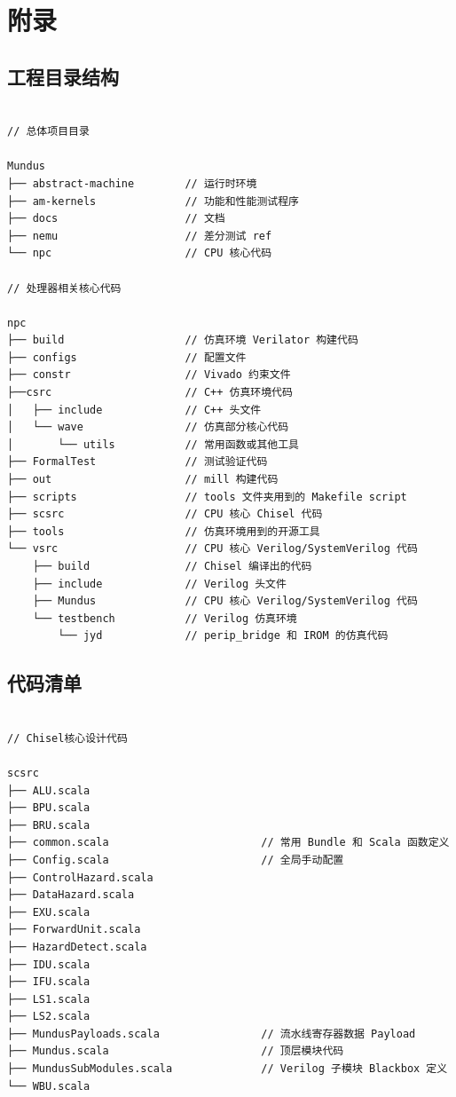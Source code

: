 \documentclass[UTF8,a4paper,zihao=-4]{ctexart}
\begin{document}
\section{附录}

\subsection{工程目录结构}

\begin{minipage}{\linewidth}
\begin{Verbatim}[fontsize=\small]

// 总体项目目录

Mundus
├── abstract-machine        // 运行时环境
├── am-kernels              // 功能和性能测试程序
├── docs                    // 文档
├── nemu                    // 差分测试 ref
└── npc                     // CPU 核心代码

// 处理器相关核心代码

npc
├── build                   // 仿真环境 Verilator 构建代码
├── configs                 // 配置文件
├── constr                  // Vivado 约束文件
├──csrc                     // C++ 仿真环境代码
│   ├── include             // C++ 头文件
│   └── wave                // 仿真部分核心代码
│       └── utils           // 常用函数或其他工具
├── FormalTest              // 测试验证代码
├── out                     // mill 构建代码
├── scripts                 // tools 文件夹用到的 Makefile script
├── scsrc                   // CPU 核心 Chisel 代码
├── tools                   // 仿真环境用到的开源工具
└── vsrc                    // CPU 核心 Verilog/SystemVerilog 代码
    ├── build               // Chisel 编译出的代码
    ├── include             // Verilog 头文件
    ├── Mundus              // CPU 核心 Verilog/SystemVerilog 代码
    └── testbench           // Verilog 仿真环境
        └── jyd             // perip_bridge 和 IROM 的仿真代码
\end{Verbatim}
\end{minipage}

\subsection{代码清单}

\begin{minipage}{\linewidth}
\begin{Verbatim}[fontsize=\small]

// Chisel核心设计代码

scsrc
├── ALU.scala
├── BPU.scala
├── BRU.scala
├── common.scala                        // 常用 Bundle 和 Scala 函数定义
├── Config.scala                        // 全局手动配置
├── ControlHazard.scala
├── DataHazard.scala
├── EXU.scala
├── ForwardUnit.scala
├── HazardDetect.scala
├── IDU.scala
├── IFU.scala
├── LS1.scala
├── LS2.scala
├── MundusPayloads.scala                // 流水线寄存器数据 Payload
├── Mundus.scala                        // 顶层模块代码
├── MundusSubModules.scala              // Verilog 子模块 Blackbox 定义
└── WBU.scala

\end{Verbatim}
\end{minipage}
\end{document}
